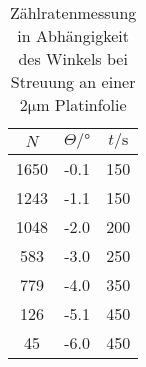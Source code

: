 \begin{table}
    \centering
    \caption{Zählratenmessung in Abhängigkeit des Winkels bei Streuung an einer $2\si{\micro\meter}$ Platinfolie}
    \label{tab:streu_platin}
    \begin{tabular}{ccc}
        \toprule
        $N$ & $\Theta/°$ & $t/\si{\second}$\\
        \midrule
        1650    &-0.1    &150\\
        1243    &-1.1    &150\\
        1048    &-2.0    &200\\
        583     &-3.0    &250\\
        779     &-4.0    &350\\
        126     &-5.1    &450\\
        45      &-6.0    &450\\
        \bottomrule
    \end{tabular}
\end{table}
